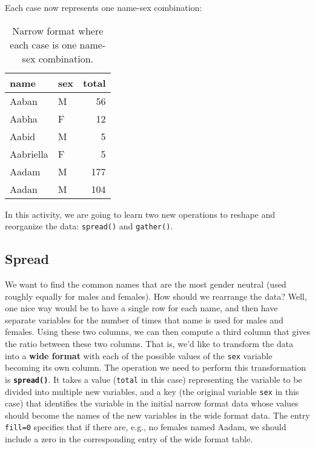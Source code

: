 \documentclass[]{tufte-handout}
\theoremstyle{definition}
\theoremstyle{definition}
\theoremstyle{definition}
\theoremstyle{remark}
\let\BeginKnitrBlock\begin \let\EndKnitrBlock\end
\begin{document}
Each case now represents one name-sex combination:

\begin{table}

\caption{\label{tab:unnamed-chunk-4}Narrow format where each case is one name-sex combination.}
\centering
\begin{tabular}[t]{l|l|r}
\hline
name & sex & total\\
\hline
Aaban & M & 56\\
\hline
Aabha & F & 12\\
\hline
Aabid & M & 5\\
\hline
Aabriella & F & 5\\
\hline
Aadam & M & 177\\
\hline
Aadan & M & 104\\
\hline
\end{tabular}
\end{table}

In this activity, we are going to learn two new operations to reshape
and reorganize the data: \texttt{spread()} and \texttt{gather()}.

\subsection{Spread}\label{spread}

\BeginKnitrBlock{example}
\protect\hypertarget{exm:unnamed-chunk-5}{}{\label{exm:unnamed-chunk-5} }We
want to find the common names that are the most gender neutral (used
roughly equally for males and females). How should we rearrange the
data? Well, one nice way would be to have a single row for each name,
and then have separate variables for the number of times that name is
used for males and females. Using these two columns, we can then compute
a third column that gives the ratio between these two columns. That is,
we'd like to transform the data into a \textbf{wide format} with each of
the possible values of the \texttt{sex} variable becoming its own
column. The operation we need to perform this transformation is
\textbf{\texttt{spread()}}. It takes a value (\texttt{total} in this
case) representing the variable to be divided into multiple new
variables, and a key (the original variable \texttt{sex} in this case)
that identifies the variable in the initial narrow format data whose
values should become the names of the new variables in the wide format
data. The entry \texttt{fill=0} specifies that if there are, e.g., no
females named Aadam, we should include a zero in the corresponding entry
of the wide format table.
\EndKnitrBlock{example}
\end{document}
